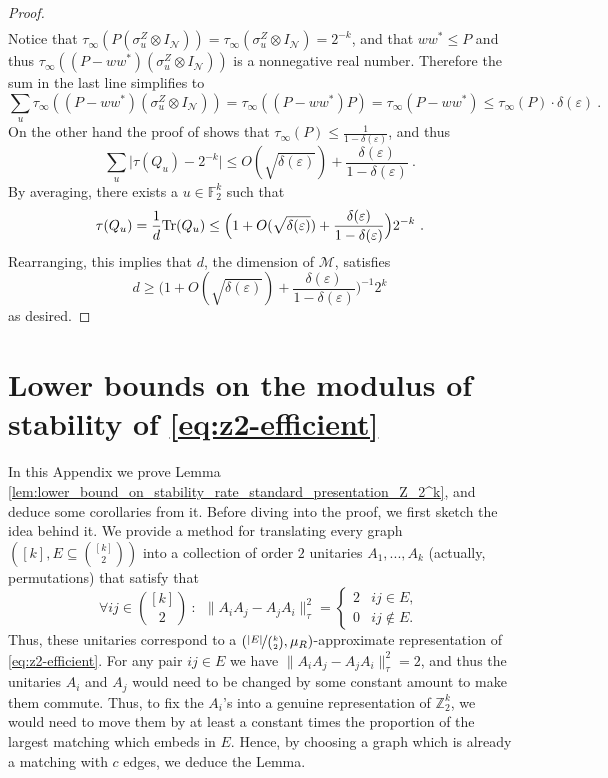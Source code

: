 \documentclass[11pt]{article}
\theoremstyle{definition}
\newcommand{\Tr}{\mbox{\rm Tr}}
\newcommand{\F}{\ensuremath{\mathbb{F}}}
\newcommand{\Z}{\ensuremath{\mathbb{Z}}}
\newcommand{\mM}{\ensuremath{\mathcal{M}}}
\newcommand{\eps}{\varepsilon}
\newcommand{\mN}{\mathcal{N}}
\begin{document}
\begin{proof}
\begin{align*}
\end{align*}
Notice that $\tau_\infty (P (\sigma^Z_u \otimes I_\mN)) = \tau_\infty (\sigma^Z_u \otimes I_\mN) = 2^{-k}$, and that $ww^* \leq P$ and thus $\tau_\infty((P - ww^*)(\sigma^Z_u \otimes I_\mN))$ is a nonnegative real number. Therefore the sum in the last line simplifies to
\[
\sum_u \tau_\infty((P - ww^*)(\sigma^Z_u \otimes I_\mN)) = \tau_\infty((P - ww^*) P) = \tau_\infty(P - ww^*) \leq \tau_\infty(P) \cdot \delta(\eps)~.
\]
On the other hand the proof of  shows that $\tau_\infty(P) \leq \frac{1}{1 - \delta(\eps)}$, and thus 
\[
\sum_u \Big| \tau(Q_u) - 2^{-k} \Big| \leq O(\sqrt{\delta(\eps)}) + \frac{\delta(\eps)}{1 - \delta(\eps)}~.
\]
By averaging, there exists a $u \in \F_2^k$ such that
\[
\tau(Q_u) = \frac{1}{d} \Tr(Q_u) \leq  \Big( 1 + O(\sqrt{\delta(\eps)}) + \frac{\delta(\eps)}{1 - \delta(\eps)}\Big) 2^{-k}~.
\]
Rearranging, this implies that $d$, the dimension of $\mM$, satisfies
\[
	d \geq \Big( 1 + O(\sqrt{\delta(\eps)}) + \frac{\delta(\eps)}{1 - \delta(\eps)}\Big)^{-1} 2^k
\]
as desired.
\end{proof}

\appendix
\section{Lower bounds on the modulus of stability of \eqref{eq:z2-efficient}}\label{appendix:lower_bounds}
In this Appendix we prove Lemma \ref{lem:lower_bound_on_stability_rate_standard_presentation_Z_2^k}, and deduce some corollaries from it. 
Before diving into the proof, we first sketch the idea behind it. 
We provide a method for translating every graph $([k],E\subseteq{\binom{[k]}{2}})$ into a collection of order $2$ unitaries $A_1,...,A_k$ (actually, permutations) that satisfy that
\begin{equation}\label{eq:commuting_or_not}
   \forall ij\in \binom{[k]}{2}\ \colon\ \ \|A_iA_j-A_jA_i\|_\tau^2=\begin{cases}
    2 & ij\in E,\\
    0 & ij\notin E.
\end{cases} 
\end{equation}
Thus, these unitaries correspond to a $(\nicefrac{|E|}{\binom{k}{2}},\mu_R)$-approximate representation of \eqref{eq:z2-efficient}. For any pair $ij\in E$ we have $\|A_iA_j-A_jA_i\|_\tau^2=2$, and thus the unitaries $A_i$ and $A_j$ would need to be changed  by some constant amount to make them commute. Thus, to fix the $A_i$'s into a genuine representation of $\Z_2^k$, we would need to move them by at least a constant times the proportion of the largest   matching which embeds in $E$. Hence, by choosing a graph which is already a  matching with $c$ edges, we deduce the Lemma. 
\end{document}

